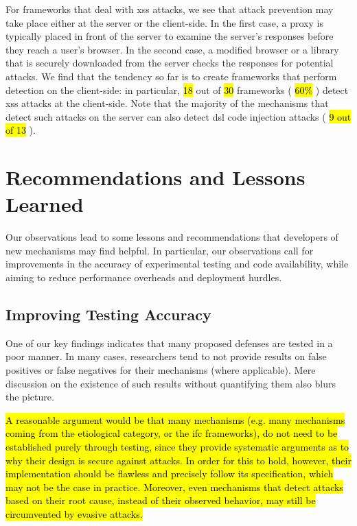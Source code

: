 \documentclass[10pt,journal,compsoc]{IEEEtran}
\newcommand{\hlc}[2][yellow]{ {\sethlcolor{#1} \hl{#2}} }
\begin{document}
For frameworks that deal with {\sc xss} attacks, we
see that attack prevention may take place either at the server or
the client-side. In the first case, a proxy is typically placed in front of the server
to examine the server's responses before they reach a user's 
browser. In the second case, a modified browser or a library that is
securely downloaded from the server checks the responses for potential
attacks. We find that the tendency so far is to create frameworks that
perform detection on the client-side: in particular,
\hlc[yellow]{18} out of \hlc[yellow]{30}
frameworks (\hlc[yellow]{60\%}) detect {\sc xss} attacks at the
client-side. Note that the majority of the mechanisms that detect
such attacks on the server can also detect {\sc dsl} code
injection attacks (\hlc[yellow]{9 out of 13}).

\section{Recommendations and Lessons Learned}
\label{sec:lessons-learned}

Our observations lead to some lessons and recommendations that
developers of new mechanisms may find helpful. In particular,
our observations
call for improvements in the accuracy of experimental testing
and code availability, while
aiming to reduce performance overheads and deployment hurdles.

\subsection{Improving Testing Accuracy}

One of our key findings indicates that many proposed defenses are
tested in a poor manner. In many cases, researchers tend to not provide
results on false positives or false negatives for their mechanisms
(where applicable).
Mere discussion on the existence of such results without quantifying
them also blurs the picture.

\hlc[yellow]{A reasonable argument would be that many mechanisms
(e.g. many mechanisms coming from the etiological category,
or the {\sc ifc} frameworks), do not need to be
established purely through testing, since they provide systematic
arguments as to why their design is secure against attacks.
In order for this to hold,
however, their implementation should be flawless
and precisely follow its specification, which may not
be the case in practice. Moreover, even mechanisms that detect attacks
based on their root cause, instead of their observed behavior, may still be
circumvented by evasive attacks.}
\end{document}
